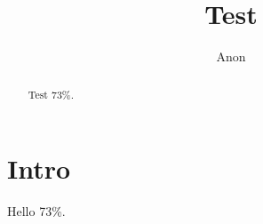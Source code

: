 \documentclass[letterpaper,twocolumn,10pt]{article}
\title{Test}
\author{Anon}
\theoremstyle{definition}
\newcommand{\PairsCHrate}{73\%\xspace}
\begin{document}
\maketitle
\begin{abstract}Test \PairsCHrate.\end{abstract}
\section{Intro}
Hello \PairsCHrate.
\end{document}
